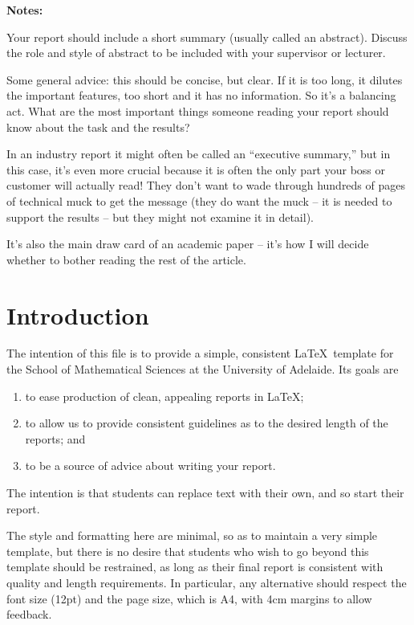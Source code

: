 \documentclass[12pt,a4paper]{article}
\begin{document}
\vspace{10mm}
\noindent \hrulefill

{\bf Notes:}
{Your report should include a short summary (usually called an
abstract). Discuss the role and style of abstract to be included with
your supervisor or lecturer.

Some general advice: this should be concise, but clear. If it is too
long, it dilutes the important features, too short and it has no
information. So it's a balancing act. What are the most important
things someone reading your report should know about the task and the
results?

In an industry report it might often be called an ``executive
summary,'' but in this case, it's even more crucial because it is
often the only part your boss or customer will actually read! They
don't want to wade through hundreds of pages of technical muck to get
the message (they do want the muck -- it is needed to support the
results -- but they might not examine it in detail).

It's also the main draw card of an academic paper -- it's how I will
decide whether to bother reading the rest of the article. \par}


\clearpage
\section{Introduction}

The intention of this file is to provide a simple, consistent \LaTeX\
template for the School of Mathematical Sciences at the University of
Adelaide. Its goals are
\begin{enumerate}
\item to ease production of clean, appealing reports in \LaTeX ;

\item to allow us to provide consistent guidelines as to the desired
  length of the reports; and

\item to be a source of advice about writing your report.

\end{enumerate}
The intention is that students can replace text with their own, and so
start their report. 

The style and formatting here are minimal, so as to maintain a very
simple template, but there is no desire that students who wish to go
beyond this template should be restrained, as long as their final
report is consistent with quality and length requirements. In
particular, any alternative should respect the font size (12pt) and
the page size, which is A4, with 4cm margins to allow feedback.
\end{document}

